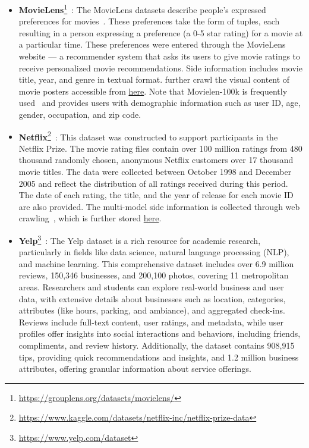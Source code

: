 \begin{itemize}[leftmargin=*]
    \item \textbf{MovieLens}\footnote{\href{https://grouplens.org/datasets/movielens/}{https://grouplens.org/datasets/movielens/}}~\cite{wang2023zero, wei2024llmrec, zeng2024federated}: The MovieLens datasets describe people’s expressed preferences for movies~\cite{harper2015movielens}. These preferences take the form of tuples, each resulting in a person expressing a preference (a 0-5 star rating) for a movie at a particular time. These preferences were entered through the MovieLens website — a recommender system that asks its users to give movie ratings to receive personalized movie recommendations. Side information includes movie title, year, and genre in textual format. \cite{wei2024llmrec} further crawl the visual content of movie posters accessible from \href{https://github.com/HKUDS/LLMRec}{here}. Note that Movielen-100k is frequently used~\cite{wei2024llmrec, zeng2024federated} and provides users with demographic information such as user ID, age, gender, occupation, and zip code.

    \item \textbf{Netflix}\footnote{\href{https://www.kaggle.com/datasets/netflix-inc/netflix-prize-data}{https://www.kaggle.com/datasets/netflix-inc/netflix-prize-data}}~\cite{wei2024llmrec}: This dataset was constructed to support participants in the Netflix Prize. The movie rating files contain over 100 million ratings from 480 thousand randomly chosen, anonymous Netflix customers over 17 thousand movie titles.  The data were collected between October 1998 and December 2005 and reflect the distribution of all ratings received during this period. The date of each rating, the title, and the year of release for each movie ID are also provided. The multi-model side information is collected through web crawling~\cite{wei2024llmrec}, which is further stored \href{https://github.com/HKUDS/LLMRec}{here}.

    \item \textbf{Yelp}\footnote{\href{https://www.yelp.com/dataset}{https://www.yelp.com/dataset}}~\cite{xie2023factual}: The Yelp dataset is a rich resource for academic research, particularly in fields like data science, natural language processing (NLP), and machine learning. This comprehensive dataset includes over 6.9 million reviews, 150,346 businesses, and 200,100 photos, covering 11 metropolitan areas. Researchers and students can explore real-world business and user data, with extensive details about businesses such as location, categories, attributes (like hours, parking, and ambiance), and aggregated check-ins. Reviews include full-text content, user ratings, and metadata, while user profiles offer insights into social interactions and behaviors, including friends, compliments, and review history. Additionally, the dataset contains 908,915 tips, providing quick recommendations and insights, and 1.2 million business attributes, offering granular information about service offerings.



\end{itemize}
